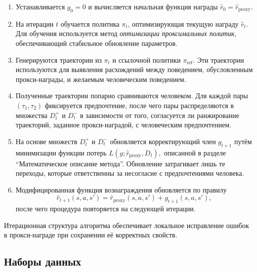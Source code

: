 \begin{enumerate}
    \item Устанавливается $g_0 = 0$ и вычисляется начальная функция 
    награды $\hat r_0 = \hat r_{\text{proxy}}$.

    \item На итерации $t$ обучается политика $\pi_t$, оптимизирующая 
    текущую награду $\hat r_t$. Для обучения используется метод 
    \emph{оптимизации проксимальных политик}, обеспечивающий стабильное 
    обновление параметров.

    \item Генерируются траектории из $\pi_t$ и ссылочной политики 
    $\pi_{\text{ref}}$. Эти траектории используются для выявления расхождений 
    между поведением, обусловленным прокси-награды, и желаемым 
    человеческим поведением.

    \item Полученные траектории попарно сравниваются человеком. Для каждой 
    пары $(\tau_1, \tau_2)$ фиксируется предпочтение, после чего пары 
    распределяются в множества $D_t^+$ и $D_t^-$ в зависимости от того, 
    согласуется ли ранжирование траекторий, заданное прокси-наградой, 
    с человеческим предпочтением.

    \item На основе множеств $D_t^+$ и $D_t^-$ обновляется корректирующий 
    член $g_{t+1}$ путём минимизации функции потерь
    $
        L(g; \hat r_{\text{proxy}}, D_t),
    $
    описанной в разделе ``Математическое описание метода''. 
    Обновление затрагивает лишь те переходы, которые ответственны за 
    несогласие с предпочтениями человека.

    \item Модифицированная функция вознаграждения обновляется по правилу
    \begin{equation}
        \hat r_{t+1}(s,a,s') = \hat r_{\text{proxy}}(s,a,s') + g_{t+1}(s,a,s'),
    \end{equation}
    после чего процедура повторяется на следующей итерации.
\end{enumerate}

Итерационная структура алгоритма обеспечивает локальное исправление ошибок 
в прокси-награде при сохранении её корректных свойств.


\subsection{Наборы данных}

